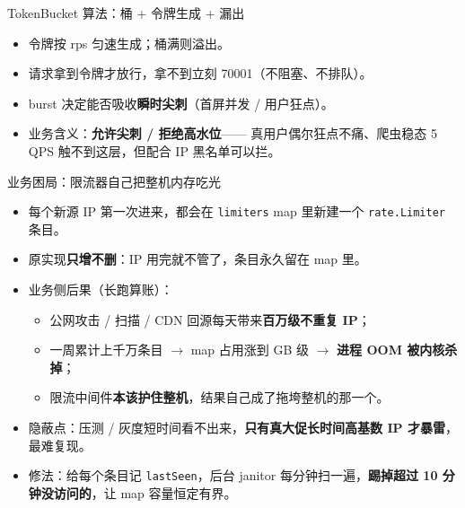 \documentclass[aspectratio=169,11pt]{beamer}
\begin{document}
\begin{frame}[shrink]{TokenBucket 算法：桶 + 令牌生成 + 漏出}
\vspace{2mm}
\begin{itemize}
  \item 令牌按 rps 匀速生成；桶满则溢出。
  \item 请求拿到令牌才放行，拿不到立刻 70001（不阻塞、不排队）。
  \item burst 决定能否吸收\textbf{瞬时尖刺}（首屏并发 / 用户狂点）。
  \item 业务含义：\textbf{允许尖刺 / 拒绝高水位}—— 真用户偶尔狂点不痛、爬虫稳态 5 QPS 触不到这层，但配合 IP 黑名单可以拦。
\end{itemize}
\end{frame}

\begin{frame}[shrink]{业务困局：限流器自己把整机内存吃光}
\begin{itemize}
  \item 每个新源 IP 第一次进来，都会在 \texttt{limiters} map 里新建一个 \texttt{rate.Limiter} 条目。
  \item 原实现\textbf{只增不删}：IP 用完就不管了，条目永久留在 map 里。
  \item 业务侧后果（长跑算账）：
  \begin{itemize}
    \item 公网攻击 / 扫描 / CDN 回源每天带来\textbf{百万级不重复 IP}；
    \item 一周累计上千万条目 $\to$ map 占用涨到 GB 级 $\to$ \textbf{进程 OOM 被内核杀掉}；
    \item 限流中间件\textbf{本该护住整机}，结果自己成了拖垮整机的那一个。
  \end{itemize}
  \item 隐蔽点：压测 / 灰度短时间看不出来，\textbf{只有真大促长时间高基数 IP 才暴雷}，最难复现。
  \item 修法：给每个条目记 \texttt{lastSeen}，后台 janitor 每分钟扫一遍，\textbf{踢掉超过 10 分钟没访问的}，让 map 容量恒定有界。
\end{itemize}
\end{frame}
\end{document}
